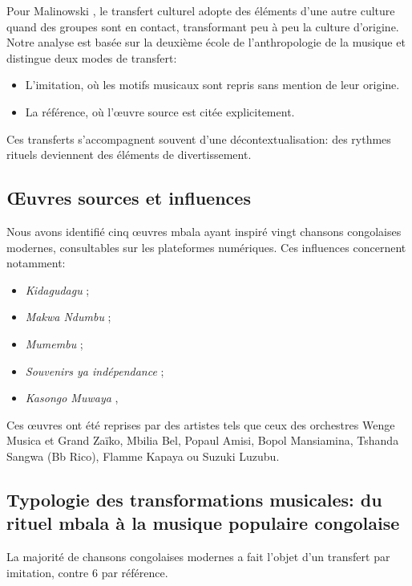 \documentclass[final,fra]{anthology-ch}         %
\begin{document}
Pour Malinowski \cite{malinowski1945dynamics}, le transfert culturel adopte des éléments d'une autre culture quand des groupes sont en contact, transformant peu à peu la culture d'origine. Notre analyse est basée sur la deuxième école de l’anthropologie de la musique  \cite{ayats_tout_1996} et distingue deux modes de transfert:

\begin{itemize}
    \item L'imitation, où les motifs musicaux sont repris sans mention de leur origine.
    \item La référence, où l'œuvre source est citée explicitement.
\end{itemize}

\noindent Ces transferts s'accompagnent souvent d'une décontextualisation: des rythmes rituels deviennent des éléments de divertissement.

\subsection{Œuvres sources et influences}

Nous avons identifié cinq œuvres mbala ayant inspiré vingt chansons congolaises modernes, consultables sur les plateformes numériques. Ces influences concernent notamment:

\begin{itemize}
    \item \textit{Kidagudagu} \cite{mbanga_mumbungu_gi_1982};
    \item \textit{Makwa Ndumbu} \cite{mavula_bankwa_1957};
    \item \textit{Mumembu} \cite{mapombu_mumembu_nodate};
    \item \textit{Souvenirs ya indépendance} \cite{mavula_souvenir_2006};
    \item \textit{Kasongo Muwaya} \cite{mbanga_mumbungu_kasongo_1986},
\end{itemize}

Ces œuvres ont été reprises par des artistes tels que ceux des orchestres Wenge Musica et Grand Zaïko, Mbilia Bel, Popaul Amisi, Bopol Mansiamina, Tshanda Sangwa (Bb Rico), Flamme Kapaya ou Suzuki Luzubu. \subsection{Typologie des transformations musicales: du rituel mbala à la musique populaire congolaise}

La majorité de chansons congolaises modernes a fait l'objet d'un transfert par imitation, contre 6 par référence.
\end{document}
